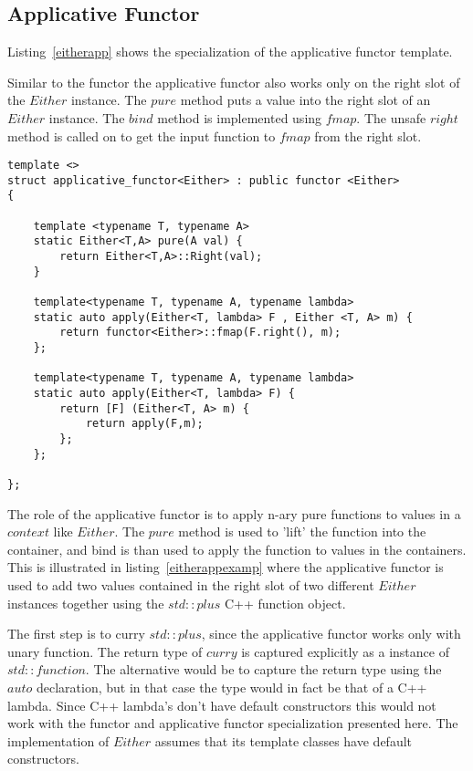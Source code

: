 \documentclass[12pt,fleqn]{article}
\begin{document}
\subsection{Applicative Functor}
%

Listing~\ref{eitherapp} shows the specialization of the applicative functor template.

Similar to the functor the applicative functor also works only on the right slot of the $Either$ instance.
The $pure$ method puts a value into the right slot of an $Either$ instance.
The $bind$ method is implemented using $fmap$. 
The unsafe $right$ method is called on to get the input function to $fmap$ from the right slot.

%
%
\begin{minipage}{\linewidth}
\begin{lstlisting}[caption=Either applicative functor,label=eitherapp]
template <> 
struct applicative_functor<Either> : public functor <Either>
{

	template <typename T, typename A> 
	static Either<T,A> pure(A val) {
		return Either<T,A>::Right(val);
	}

	template<typename T, typename A, typename lambda>
	static auto apply(Either<T, lambda> F , Either <T, A> m) {
		return functor<Either>::fmap(F.right(), m);
	};

	template<typename T, typename A, typename lambda>
	static auto apply(Either<T, lambda> F) {
		return [F] (Either<T, A> m) {
			return apply(F,m);
		};
	};

};
\end{lstlisting}
\end{minipage}
%
%
%

The role of the applicative functor is to apply n-ary pure functions to values in a $context$ like $Either$.
The $pure$ method is used to 'lift' the function into the container, and bind is than used to apply the function to values in the containers.
This is illustrated in listing~\ref{eitherappexamp} where the applicative functor is used to add two values contained in the right slot of two 
different $Either$ instances together using the $std::plus$ C++ function object.

The first step is to curry $std::plus$, since the applicative functor works only with unary function.
The return type of $curry$ is captured explicitly as a instance of $std::function$. 
The alternative would be to capture the return type using the $auto$ declaration, but in that case the type would in fact be that of a C++ lambda.
Since C++ lambda's don't have default constructors this would not work with the functor and applicative functor specialization presented here.
The implementation of $Either$ assumes that its template classes have default constructors. 
\end{document}
